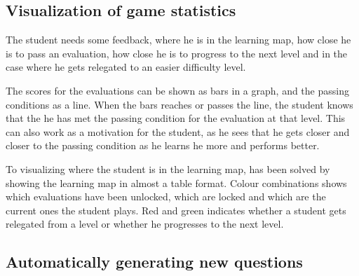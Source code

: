 \subsection{Visualization of game statistics}
The student needs some feedback, where he is in the learning map, how close he is to pass an evaluation, how close he is to progress to the next level and in the case where he gets relegated to an easier difficulty level.

The scores for the evaluations can be shown as bars in a graph, and the passing conditions as a line. When the bars reaches or passes the line, the student knows that the he has met the passing condition for the evaluation at that level. This can also work as a motivation for the student, as he sees that he gets closer and closer to the passing condition as he learns he more and performs better.

To visualizing where the student is in the learning map, has been solved by showing the learning map in almost a table format. Colour combinations shows which evaluations have been unlocked, which are locked and which are the current ones the student plays. Red and green indicates whether a student gets relegated from a level or whether he progresses to the next level.



 
\subsection{Automatically generating new questions}
